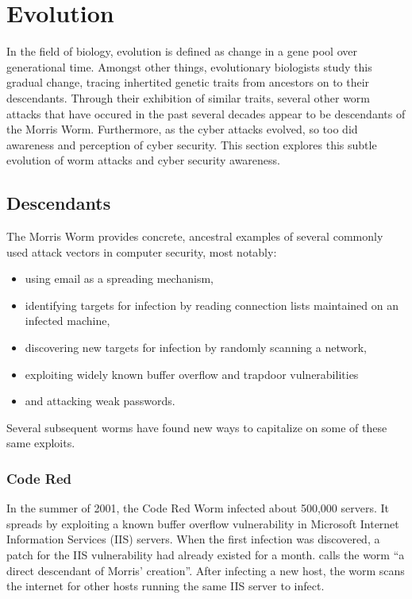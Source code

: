 \section*{Evolution}
In the field of biology, evolution is defined as change in a gene pool over
generational time. Amongst other things, evolutionary biologists study this
gradual change, tracing inhertited genetic traits from ancestors on to
their descendants. Through their exhibition of similar traits, several
other worm attacks that have occured in the past several decades appear to be
descendants of the Morris Worm. Furthermore, as the cyber attacks evolved, so
too did awareness and perception of cyber security. This section explores this
subtle evolution of worm attacks and cyber security awareness.

\subsection*{Descendants}
The Morris Worm provides concrete, ancestral examples of several commonly used
attack vectors in computer security, most notably:
\begin{itemize}
  \item using email as a spreading mechanism,
  \item identifying targets for infection by reading connection lists maintained
  on an infected machine,
  \item discovering new targets for infection by randomly scanning a network,
  \item exploiting widely known buffer overflow and trapdoor vulnerabilities
  \item and attacking weak passwords.
\end{itemize}
Several subsequent worms have found new ways to capitalize on some of these same
exploits.
\subsubsection*{Code Red}
In the summer of 2001, the Code Red Worm infected about 500,000 servers.
It spreads by exploiting a known buffer overflow vulnerability in Microsoft
Internet Information Services (IIS) servers. When the first infection was
discovered, a patch for the IIS vulnerability had already existed for a
month\cite{fisher_code_2001}. \cite{fisher_living_2002} calls
the worm ``a direct descendant of Morris' creation''. 
After infecting a new host, the worm scans the internet for other hosts running
the same IIS server to infect. 

